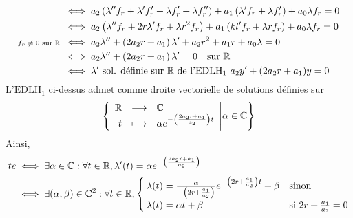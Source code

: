 \documentclass{article}
\renewenvironment{question_kholle}[2][ ]
{
	\subsection{\texorpdfstring{#2}{}}
	\notblank{#1}
	{
		\noindent #1
		\bigbreak
	}
	{}
	\begin{proof}
}
{
	\end{proof}
}
\begin{document}
\begin{question_kholle}
\begin{align}
		                                        & \iff a_{2} \left(\lambda'' f_{r} + \lambda' f_{r}' + \lambda f_{r}' + \lambda f_{r}''\right) + a_{1} \left(\lambda' f_{r} + \lambda f_{r}'\right) + a_{0} \lambda f_{r} = 0                              \nonumber \\
		                                        & \iff a_{2} \left(\lambda'' f_{r} + 2r \lambda' f_{r} + \lambda r^{2} f_{r}\right) + a_{1} \left(kl' f_{r} + \lambda r f_{r}\right)+ a_{0} \lambda f_{r} = 0                                     \nonumber          \\
		\text{\scriptsize $f_{r}\neq 0$ sur \ensuremath{\mathbb R} } & \iff a_{2} \lambda'' + \left(2a_{2}r + a_{1}\right)\lambda' + a_{2}r^{2} + a_{1}r + a_{0}\lambda = 0                                                                                  \nonumber                    \\
		                                        & \iff a_{2} \lambda'' + \left(2a_{2}r +a_{1}\right)\lambda' = 0 \quad\text{sur } \mathbb R                                                                                          \nonumber                              \\
		                                        & \iff \lambda' \text{ sol. définie sur \ensuremath{\mathbb R} de l'$\mathrm{EDLH_{1}}$ } a_{2}y' + (2a_{2}r + a_{1})y=0 \label{s7:q2:1}
	\end{align}
	L'$\mathrm{EDLH_{1}}$ ci-dessus admet comme droite vectorielle de solutions définies sur \R
	\[
		\left\{\begin{array}{rcl} \mathbb R & \longrightarrow & \mathbb C \\ t & \longmapsto & \alpha e^{-\left(\frac{2a_{2}r+a_{1}}{a_{2}}\right)t} \end{array} \middle | \alpha\in\mathbb C\right\}
	\]
	Ainsi,
	\begin{align*}
		te & \iff \exists \alpha\in\C: \forall t\in\R, \lambda'(t)=\alpha e^{-\left(\frac{2a_{2}r + a_{1}}{a_{2}}\right)}                                                                                                                                                 \\
		   & \iff \exists (\alpha, \beta)\in\C^{2}: \forall t\in\R, \begin{cases}
			                                                            \lambda(t)=\frac{\alpha}{-\left(2r+\frac{a_{1}}{a_{2}}\right)}e^{-\left(2r+\frac{a_{1}}{a_{2}}\right)t}+\beta & \text{sinon}                        \\
			                                                            \lambda(t)=\alpha t+\beta                                                                                     & \text{si } 2r+\frac{a_{1}}{a_{2}}=0
		                                                            \end{cases} \\

\end{align*}
\end{question_kholle}
\end{document}
